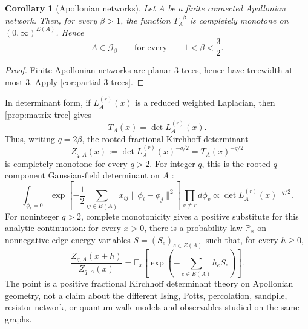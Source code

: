 \documentclass[preprint,12pt,authoryear]{elsarticle}
\numberwithin{equation}{section}
\newtheorem{corollary}[theorem]{Corollary}
\theoremstyle{definition}
\theoremstyle{remark}
\newcommand{\calG}{\mathcal{G}}
\newcommand{\1}{\mathbf{1}}
\begin{document}
\begin{corollary}[Apollonian networks]
\label{cor:apollonian}
Let \(A\) be a finite connected Apollonian network.  Then, for every \(\beta>1\), the function \(T_A^{-\beta}\) is completely monotone on \((0,\infty)^{E(A)}\).  Hence
\begin{equation}
        A\in\calG_\beta
        \qquad\text{for every}\qquad
        1<\beta<\frac32 .
\end{equation}
\end{corollary}

\begin{proof}
Finite Apollonian networks are planar \(3\)-trees, hence have treewidth at most \(3\).  Apply \cref{cor:partial-3-trees}.
\end{proof}

In determinant form, if \(L_A^{(r)}(x)\) is a reduced weighted Laplacian, then \cref{prop:matrix-tree} gives
\begin{equation}
        T_A(x)=\det L_A^{(r)}(x).
\end{equation}
Thus, writing \(q=2\beta\), the rooted fractional Kirchhoff determinant
\begin{equation}
        Z_{q,A}(x)
        :=
        \det L_A^{(r)}(x)^{-q/2}
        =
        T_A(x)^{-q/2}
\end{equation}
is completely monotone for every \(q>2\).  For integer \(q\), this is the rooted \(q\)-component Gaussian-field determinant on \(A\) \cite{LeJan2011}:
\begin{equation}
        \int_{\phi_r=0}
        \exp\left[
        -\frac12\sum_{ij\in E(A)}x_{ij}\|\phi_i-\phi_j\|^2
        \right]\prod_{v\ne r}d\phi_v
        \propto
        \det L_A^{(r)}(x)^{-q/2}.
\end{equation}
For noninteger \(q>2\), complete monotonicity gives a positive substitute for this analytic continuation: for every \(x>0\), there is a probability law \(\mathbb P_x\) on nonnegative edge-energy variables \(S=(S_e)_{e\in E(A)}\) such that, for every \(h\ge0\),
\begin{equation}
        \frac{Z_{q,A}(x+h)}{Z_{q,A}(x)}
        =
        \mathbb E_x\left[
        \exp\left(-\sum_{e\in E(A)}h_eS_e\right)
        \right].
\end{equation}
The point is a positive fractional Kirchhoff determinant theory on Apollonian geometry, not a claim about the different Ising, Potts, percolation, sandpile, resistor-network, or quantum-walk models and observables studied on the same graphs.
\end{document}
